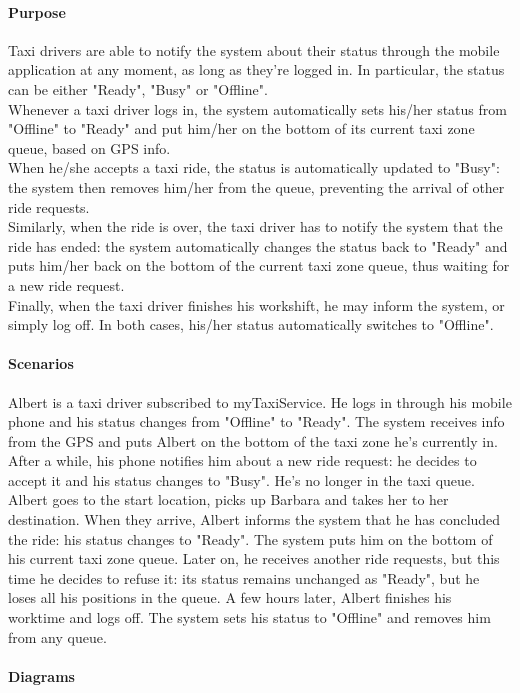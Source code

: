 \paragraph{Purpose}
Taxi drivers are able to notify the system about their status through the mobile application at any moment, as long as they're logged in. In particular, the status can be either "Ready", "Busy" or "Offline".\\
Whenever a taxi driver logs in, the system automatically sets his/her status from "Offline" to "Ready" and put him/her on the bottom of its current taxi zone queue, based on GPS info.\\
When he/she accepts a taxi ride, the status is automatically updated to "Busy": the system then removes him/her from the queue, preventing the arrival of other ride requests.\\
Similarly, when the ride is over, the taxi driver has to notify the system that the ride has ended: the system automatically changes the status back to "Ready" and puts him/her back on the bottom of the current taxi zone queue, thus waiting for a new ride request.\\
Finally, when the taxi driver finishes his workshift, he may inform the system, or simply log off. In both cases, his/her status automatically switches to "Offline".

\paragraph{Scenarios}
Albert is a taxi driver subscribed to myTaxiService. He logs in through his mobile phone and his status changes from "Offline" to "Ready". The system receives info from the GPS and puts Albert on the bottom of the taxi zone he's currently in. After a while, his phone notifies him about a new ride request: he decides to accept it and his status changes to "Busy". He's no longer in the taxi queue. Albert goes to the start location, picks up Barbara and takes her to her destination. When they arrive, Albert informs the system that he has concluded the ride: his status changes to "Ready". The system puts him on the bottom of his current taxi zone queue. Later on, he receives another ride requests, but this time he decides to refuse it: its status remains unchanged as "Ready", but he loses all his positions in the queue.
A few hours later, Albert finishes his worktime and logs off. The system sets his status to "Offline" and removes him from any queue.

\paragraph{Diagrams}

